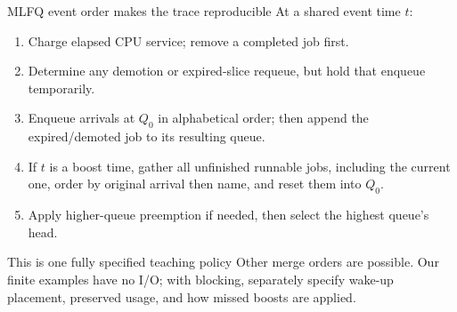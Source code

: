 \documentclass[aspectratio=169,11pt]{beamer}
\begin{document}
\begin{frame}{MLFQ event order makes the trace reproducible}
  \small At a shared event time $t$:
  \begin{enumerate}
    \item Charge elapsed CPU service; remove a completed job first.
    \item Determine any demotion or expired-slice requeue, but hold that enqueue temporarily.
    \item Enqueue arrivals at $Q_0$ in alphabetical order; then append the expired/demoted job to its resulting queue.
    \item If $t$ is a boost time, gather all unfinished runnable jobs, including the current one, order by original arrival then name, and reset them into $Q_0$.
    \item Apply higher-queue preemption if needed, then select the highest queue's head.
  \end{enumerate}
  \begin{alertblock}{This is one fully specified teaching policy}
    Other merge orders are possible. Our finite examples have no I/O; with blocking, separately specify wake-up placement, preserved usage, and how missed boosts are applied.
  \end{alertblock}
\end{frame}
\end{document}
